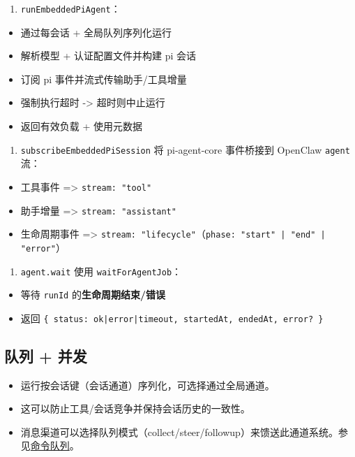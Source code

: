 \begin{enumerate}
  \item \texttt{runEmbeddedPiAgent}：
\end{enumerate}

\begin{itemize}
  \item 通过每会话 + 全局队列序列化运行
  \item 解析模型 + 认证配置文件并构建 pi 会话
  \item 订阅 pi 事件并流式传输助手/工具增量
  \item 强制执行超时 -> 超时则中止运行
  \item 返回有效负载 + 使用元数据
\end{itemize}

\begin{enumerate}
  \item \texttt{subscribeEmbeddedPiSession} 将 pi-agent-core 事件桥接到 OpenClaw \texttt{agent} 流：
\end{enumerate}

\begin{itemize}
  \item 工具事件 => \texttt{stream: "tool"}
  \item 助手增量 => \texttt{stream: "assistant"}
  \item 生命周期事件 => \texttt{stream: "lifecycle"}（\texttt{phase: "start" | "end" | "error"}）
\end{itemize}

\begin{enumerate}
  \item \texttt{agent.wait} 使用 \texttt{waitForAgentJob}：
\end{enumerate}

\begin{itemize}
  \item 等待 \texttt{runId} 的\textbf{生命周期结束/错误}
  \item 返回 \texttt{\{ status: ok|error|timeout, startedAt, endedAt, error? \}}
\end{itemize}


\subsection{队列 + 并发}


\begin{itemize}
  \item 运行按会话键（会话通道）序列化，可选择通过全局通道。
  \item 这可以防止工具/会话竞争并保持会话历史的一致性。
  \item 消息渠道可以选择队列模式（collect/steer/followup）来馈送此通道系统。参见\href{/concepts/queue}{命令队列}。
\end{itemize}


